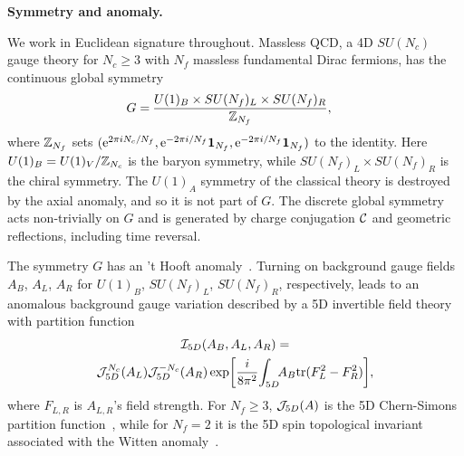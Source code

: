 \documentclass[
 reprint,







nofootinbib,


 amsmath,amssymb,
 aps,
 prd






tightenlines
]{revtex4-2}
\begin{document}
{\bf Symmetry and anomaly.}


We work in Euclidean signature throughout.
Massless QCD, a 4D $SU(N_c)$ gauge theory for $N_c\ge3$ with $N_f$ massless fundamental Dirac fermions, has the continuous global symmetry
\begin{align}
\begin{split}
    G = &\:\frac{U(1)_B \times SU(N_f)_L \times SU(N_f)_R }{\mathbb{Z}_{N_f}},
\end{split}
\label{eq:QCD_symmetry}
\end{align}
where $\mathbb{Z}_{N_f}$ sets $(\mathrm{e}^{2\pi i N_c/N_f}, \mathrm{e}^{-2\pi i/N_f}
\mathbf{1}_{N_f}, \mathrm{e}^{-2\pi i/N_f} \mathbf{1}_{N_f})$ to  the identity.
Here $U(1)_B=U(1)_V/\mathbb{Z}_{N_c}$ is the baryon symmetry, while
$SU(N_f)_{L} \times SU(N_f)_R$ is the chiral symmetry.
The $U(1)_A$ symmetry of the classical theory is destroyed by the axial anomaly, and so it is not part of $G$.
The discrete global symmetry acts non-trivially on $G$ and is generated by charge conjugation $\mathcal{C}$ and geometric reflections, including time reversal.

The symmetry $G$ has an 't Hooft anomaly~\cite{tHooft:1979rat}. Turning
on background gauge fields $A_B$, $A_L$, $A_R$ for $U(1)_B$,
$SU(N_f)_L$, $SU(N_f)_R$, respectively, leads to an anomalous
background gauge variation described by a 5D invertible field
theory~\cite{Freed:2014iua,Kapustin:2014lwa,Witten:2015aba,Yonekura:2016wuc,Bhardwaj:2023kri}
with partition function
\begin{align}\label{eq:SPT_4d}
\begin{gathered}
    \mathcal{I}_{5D}(A_B,A_L,A_R) = \\
    \mathcal{J}_{5D}^{N_c}(A_L)\mathcal{J}_{5D}^{-N_c}(A_R)
    \exp\!\left[\frac{i}{8\pi^2} \!\int_{5D}\!\! A_B \mathrm{tr}( F_L^2 - F_R^2)\right]\!,
\end{gathered}
\end{align}
where $F_{L,R}$ is $A_{L,R}$'s field strength.
For $N_f \ge 3$, $\mathcal{J}_{5D}(A)$ is the 5D Chern-Simons partition
function~\cite{Wess:1971yu}, while for $N_f=2$ it is the 5D spin
topological invariant associated with the Witten
anomaly~\cite{Witten:1982fp,Wang:2018qoy}.
\end{document}

